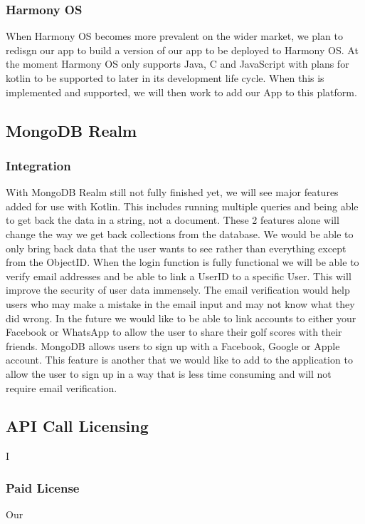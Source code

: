 \subsubsection{Harmony OS}
When Harmony OS becomes more prevalent on the wider market, we plan to redisgn our app to build a version of our app to be deployed to Harmony OS. At the moment Harmony OS only supports Java, C and JavaScript with plans for kotlin to be supported to later in its development life cycle. When this is implemented and supported, we will then work to add our App to this platform.
\newline
\subsection{MongoDB Realm}
\subsubsection{Integration}
With MongoDB Realm still not fully finished yet, we will see major features added for use with Kotlin. This includes running multiple queries and being able to get back the data in a string, not a document. These 2 features alone will change the way we get back collections from the database. We would be able to only bring back data that the user wants to see rather than everything except from the ObjectID. 
\newline
When the login function is fully functional we will be able to verify email addresses and be able to link a UserID to a specific User. This will improve the security of user data immensely. The email verification would help users who may make a mistake in the email input and may not know what they did wrong.
\newline
In the future we would like to be able to link accounts to either your Facebook or WhatsApp to allow the user to share their golf scores with their friends.
\newline
MongoDB allows users to sign up with a Facebook, Google or Apple account. This feature is another that we would like to add to the application to allow the user to sign up in a way that is less time consuming and will not require email verification.
\subsection{API Call Licensing}
I
\subsubsection{Paid License}
Our
